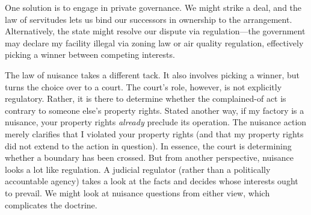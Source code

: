 One solution is to engage in private governance. We might strike a deal, and the
law of servitudes lets us bind our successors in ownership to the arrangement.
Alternatively, the state might resolve our dispute via regulation---the
government may declare my facility illegal via zoning law or air quality
regulation, effectively picking a winner between competing interests. 

The law of nuisance takes a different tack. It also involves picking a winner,
but turns the choice over to a court. The court's role, however, is not
explicitly regulatory. Rather, it is there to determine whether the
complained-of act is contrary to someone else's property rights. Stated another
way, if my factory is a nuisance, your property rights \textit{already} preclude
its operation. The nuisance action merely clarifies that I violated your
property rights (and that my property rights did not extend to the action in
question). In essence, the court is determining whether a boundary has been
crossed. But from another perspective, nuisance looks a lot like regulation. A
judicial regulator (rather than a politically accountable agency) takes a look
at the facts and decides whose interests ought to prevail. We might look at
nuisance questions from either view, which complicates the doctrine.

